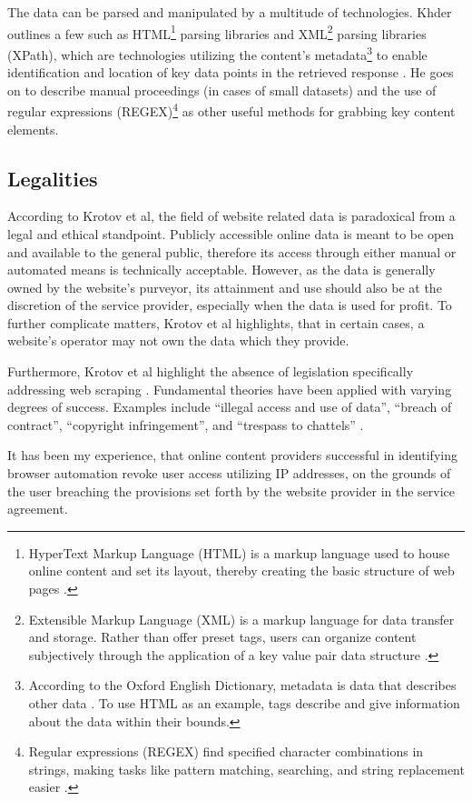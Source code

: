 \documentclass{thesis-ekf}
\theoremstyle{definition}
\theoremstyle{remark}
\begin{document}
The data can be parsed and manipulated by a multitude of technologies. Khder outlines a few such as HTML\footnote{HyperText Markup Language (HTML) is a markup language used to house online content and set its layout, thereby creating the basic structure of web pages \cite{mdn-html}.} parsing libraries and XML\footnote{Extensible Markup Language (XML) is a markup language for data transfer and storage.
Rather than offer preset tags, users can organize content subjectively through the application of a key value pair data structure \cite{mdn-xml}.} parsing libraries (XPath), which are technologies utilizing the content's metadata\footnote{According to the Oxford English Dictionary, metadata is data that describes other data \cite{oxford}. To use HTML as an example, tags describe and give information about the data within their bounds.} to enable identification and location of key data points in the retrieved response \cite{xpath}. He goes on to describe manual proceedings (in cases of small datasets) and the use of regular expressions (REGEX)\footnote{
Regular expressions (REGEX) find specified character combinations in strings, making tasks like pattern matching, searching, and string replacement easier \cite{mdn-regex}.} as other useful methods for grabbing key content elements.


\subsection{Legalities}
According to Krotov et al, the field of website related data is paradoxical from a legal and ethical standpoint. Publicly accessible online data is meant to be open and available to the general public, therefore its access through either manual or automated means is technically acceptable. However, as the data is generally owned by the website's purveyor, its attainment and use should also be at the discretion of the service provider, especially when the data is used for profit. To further complicate matters, Krotov et al highlights, that in certain cases, a website's operator may not own the data which they provide.

Furthermore, Krotov et al highlight the absence of legislation specifically addressing web scraping \cite[p.~561]{Krotov}. Fundamental theories have been applied with varying degrees of success. Examples include “illegal access and use of data”, “breach of contract”, “copyright infringement”, and “trespass to chattels”  \cite[p.~560]{Krotov}.

It has been my experience, that online content providers successful in identifying browser automation revoke user access utilizing IP addresses, on the grounds of the user breaching the provisions set forth by the website provider in the service agreement.
\end{document}
